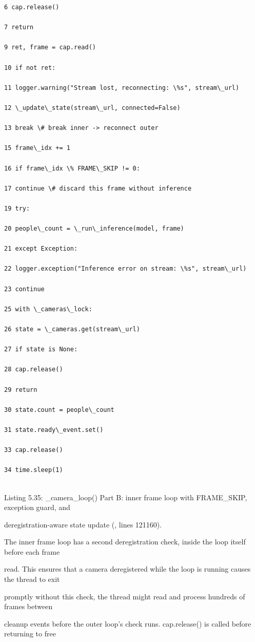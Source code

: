 \begin{listingbox}
	\begin{verbatim}
6 cap.release()

7 return

9 ret, frame = cap.read()

10 if not ret:

11 logger.warning("Stream lost, reconnecting: \%s", stream\_url)

12 \_update\_state(stream\_url, connected=False)

13 break \# break inner -> reconnect outer

15 frame\_idx += 1

16 if frame\_idx \% FRAME\_SKIP != 0:

17 continue \# discard this frame without inference

19 try:

20 people\_count = \_run\_inference(model, frame)

21 except Exception:

22 logger.exception("Inference error on stream: \%s", stream\_url)

23 continue

25 with \_cameras\_lock:

26 state = \_cameras.get(stream\_url)

27 if state is None:

28 cap.release()

29 return

30 state.count = people\_count

31 state.ready\_event.set()

33 cap.release()

34 time.sleep(1)


\end{verbatim}
\end{listingbox}
Listing 5.35: \_camera\_loop() Part B: inner frame loop with FRAME\_SKIP, exception guard, and

deregistration-aware state update (, lines 121160).

The inner frame loop has a second deregistration check, inside the loop itself before each frame

read. This ensures that a camera deregistered while the loop is running causes the thread to exit

promptly  without this check, the thread might read and process hundreds of frames between

cleanup events before the outer loop's check runs. cap.release() is called before returning to free

